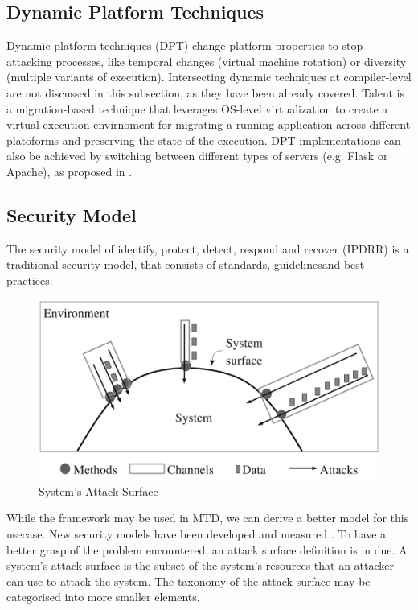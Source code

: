 \subsection{Dynamic Platform Techniques}
Dynamic platform techniques (DPT)\cite{mtd_other_classification_methods} change platform properties to stop attacking processes, like temporal changes (virtual machine rotation) or diversity (multiple variants of execution). Intersecting dynamic techniques at compiler-level are not discussed in this subsection, as they have been already covered. Talent \cite{talent_mtd_dynamic_technique} is a migration-based technique that leverages OS-level virtualization to create a virtual execution envirnoment for migrating a running application across different platoforms and preserving the state of the execution. DPT implementations can also be achieved by switching between different types of servers (e.g. Flask or Apache),  as proposed in \cite{web_servers_mtd_dynamic_technique}.

\subsection{Security Model}
The security model of identify, protect, detect, respond and recover (IPDRR) \cite{mtd_security_model_framework} is a traditional security model, that consists of standards, guidelinesand best practices. 

\begin{figure}[htbp]
  \centering
  \includegraphics[width=0.7\linewidth]{img/system_attack_surface.png}
  \caption{System's Attack Surface\cite{mtd_vol1}}
  \label{fig:system_attack_surface}
\end{figure}

While the framework may be used in MTD, we can derive a better model for this usecase. New security models have been developed and measured \cite{mtd_security_model} \cite{mtd_book2} \cite{mtd_security_model_metric}. To have a better grasp of the problem encountered, an attack surface definition is in due. A system’s attack surface is the subset of the system’s resources that an attacker can use to attack the system. The taxonomy of the attack surface may be categorised into more smaller elements.

